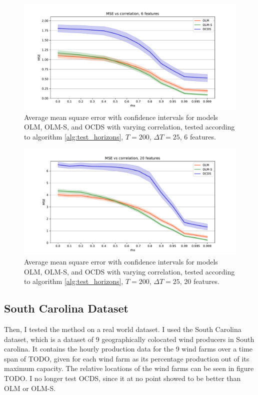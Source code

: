 \begin{figure}
  \centering
  \includegraphics[width=.9\linewidth]{Pictures/sz_200_6_feats_half_missing.pdf}
  \caption{Average mean square error with confidence intervals for models
    OLM, OLM-S, and OCDS with varying correlation, tested according to
    algorithm \ref{alg:test_horizons}, $T=200$, $\Delta T=25$, 6 features.}
  \label{fig:correlation_test_6}
\end{figure}
\begin{figure}
  \centering
  \includegraphics[width=.9\linewidth]{Pictures/sz_200_20_feats_half_missing.pdf}
  \caption{Average mean square error with confidence intervals for models
    OLM, OLM-S, and OCDS with varying correlation, tested according to
    algorithm \ref{alg:test_horizons}, $T=200$, $\Delta T=25$, 20 features.}
  \label{fig:correlation_test_20}
\end{figure}

\subsection{South Carolina Dataset} \label{sec:sc_reg}

Then, I tested the method on a real world dataset. I used the South Carolina
dataset, which is a dataset of 9 geographically colocated wind producers in
South carolina. It contains the hourly production data for the 9 wind farms
over a time span of TODO, given for each wind farm as its percentage production
out of its maximum capacity. The relative locations of the wind farms can be
seen in figure TODO. I no longer test OCDS, since it at no point showed to be
better than OLM or OLM-S.

